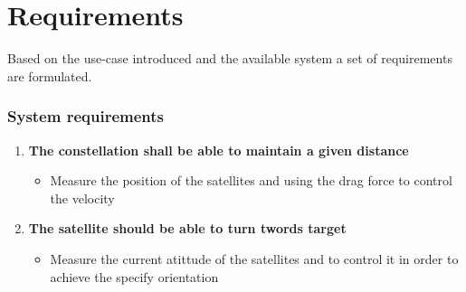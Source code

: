 \chapter{Requirements}\label{chap:requirements}
 Based on the use-case introduced and the available system a set of requirements are formulated.
%
\subsection*{System requirements}
%
\begin{enumerate}
	\item \textbf{The constellation shall be able to maintain a given distance} 
	\begin{itemize}
		\item []Measure the position of the satellites and using the drag force to control the velocity 
	\end{itemize}
	\item \textbf{The satellite should be able to turn twords target}
	\begin{itemize}
		\item[] Measure the current atittude of the satellites and to control it in order to achieve the specify orientation
	\end{itemize}
	
\end{enumerate}

